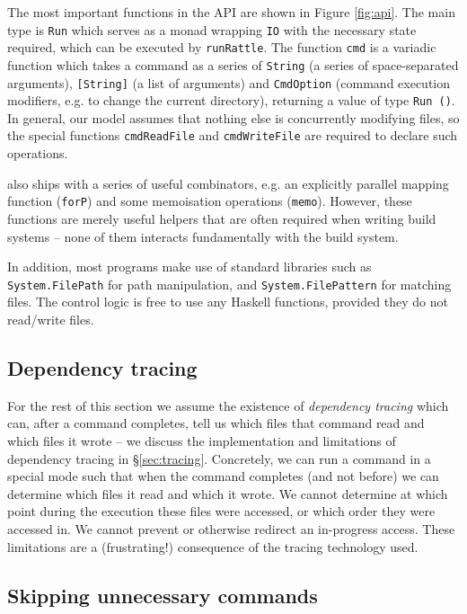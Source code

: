 The most important functions in the \Rattle API are shown in Figure \ref{fig:api}. The main type is \texttt{Run} which serves as a monad wrapping \texttt{IO} with the necessary state required, which can be executed by \texttt{runRattle}. The function \texttt{cmd} is a variadic function \cite{variadic_functions} which takes a command as a series of \texttt{String} (a series of space-separated arguments), \texttt{[String]} (a list of arguments) and \texttt{CmdOption} (command execution modifiers, e.g. to change the current directory), returning a value of type \texttt{Run ()}. In general, our model assumes that nothing else is concurrently modifying files, so the special functions \texttt{cmdReadFile} and \texttt{cmdWriteFile} are required to declare such operations.

\Rattle also ships with a series of useful combinators, e.g. an explicitly parallel mapping function (\texttt{forP}) and some memoisation operations (\texttt{memo}). However, these functions are merely useful helpers that are often required when writing build systems -- none of them interacts fundamentally with the build system.

In addition, most \Rattle programs make use of standard libraries such as \texttt{System.FilePath} for path manipulation, and \texttt{System.FilePattern} for matching files. The control logic is free to use any Haskell functions, provided they do not read/write files.

\subsection{Dependency tracing}
\label{sec:assume_tracing}

For the rest of this section we assume the existence of \emph{dependency tracing} which can, after a command completes, tell us which files that command read and which files it wrote -- we discuss the implementation and limitations of dependency tracing in \S\ref{sec:tracing}. Concretely, we can run a command in a special mode such that when the command completes (and not before) we can determine which files it read and which it wrote. We cannot determine at which point during the execution these files were accessed, or which order they were accessed in. We cannot prevent or otherwise redirect an in-progress access. These limitations are a (frustrating!) consequence of the tracing technology used.

\subsection{Skipping unnecessary commands}
\label{sec:skipping_unnecessary}

